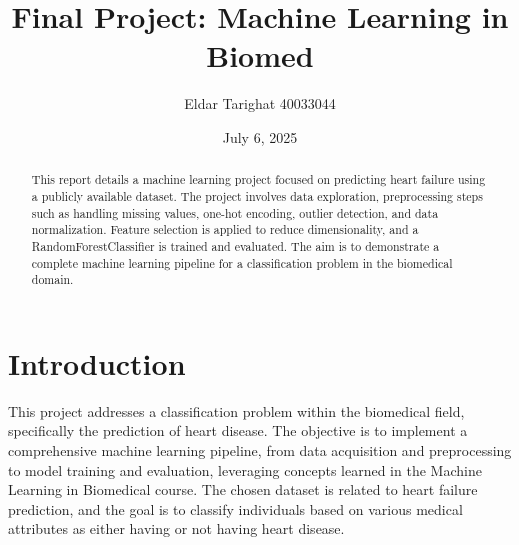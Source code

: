 \documentclass{article}
\title{Final Project: Machine Learning in Biomed}
\author{Eldar Tarighat 40033044}
\date{July 6, 2025}
\begin{document}
\maketitle

\begin{abstract}
This report details a machine learning project focused on predicting heart failure using a publicly available dataset. The project involves data exploration, preprocessing steps such as handling missing values, one-hot encoding, outlier detection, and data normalization. Feature selection is applied to reduce dimensionality, and a RandomForestClassifier is trained and evaluated. The aim is to demonstrate a complete machine learning pipeline for a classification problem in the biomedical domain.
\end{abstract}

\section{Introduction}
This project addresses a classification problem within the biomedical field, specifically the prediction of heart disease. The objective is to implement a comprehensive machine learning pipeline, from data acquisition and preprocessing to model training and evaluation, leveraging concepts learned in the Machine Learning in Biomedical course. The chosen dataset is related to heart failure prediction, and the goal is to classify individuals based on various medical attributes as either having or not having heart disease.
\end{document}
